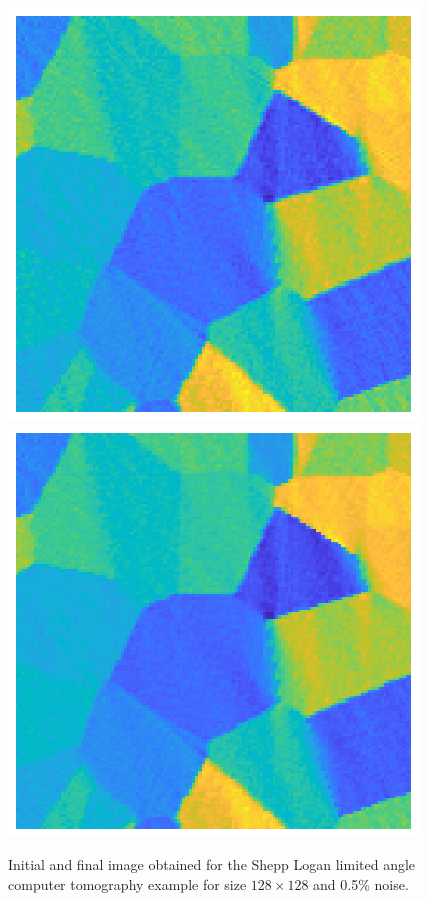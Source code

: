 \begin{figure}[htbp]
\begin{center}
\includegraphics{figures/limited_angle_grains_initial}\includegraphics{figures/limited_angle_grains_final}
\caption{Initial and final image obtained for the Shepp Logan limited angle computer tomography example for size $128 \times 128$ and 0.5\% noise.}
\label{fig:limited_angle_grains_initial_and_final}
\end{center}
\end{figure}

